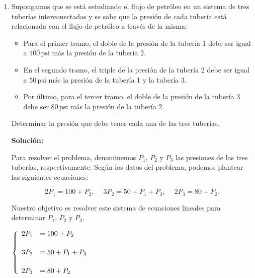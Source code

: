 \documentclass[11pt]{article}
\newcommand{\indicador}[4]{
{\tikz[remember picture,overlay]\coordinate (#1) at #2;}{\tikz[remember picture,overlay]\coordinate (#3) at #4;} 
}
\newcommand{\marka}[2]{
{\tikz[remember picture,overlay]\coordinate (#1) at #2;}
}
\begin{document}
\begin{enumerate}[\hspace{-7mm} 1) ]
\begin{enumerate}[a) ]
\textbf{Respuesta:}

Se deben extraer $\mathbf{366,\hat{6}}$ toneladas de mineral de la mina 1 y $\mathbf{33,\hat{3}}$ toneladas de mineral de la mina 2 para obtener las cantidades deseadas de níquel y cobre.

\end{enumerate}








\item 
Supongamos que se está estudiando el flujo de petróleo en un sistema de tres tuberías interconectadas y se sabe que la presión de cada tubería está relacionada con el flujo de petróleo a través de la misma:
\begin{itemize}
    \item Para el primer tramo, el doble de la presión de la tubería 1 debe ser igual a \( 100 \, \text{psi} \) más la presión de la tubería 2.
    \item En el segundo tramo, el triple de la presión de la tubería 2 debe ser igual a \( 50 \, \text{psi} \) más la presión de la tubería 1 y la tubería 3.
    \item Por último, para el tercer tramo, el doble de la presión de la tubería 3 debe ser \( 80 \, \text{psi} \) más la presión de la tubería 2.
\end{itemize}
Determinar la presión que debe tener cada una de las tres tuberías.



\textbf{Solución: }

Para resolver el problema, denominemos \( P_1 \), \( P_2 \) y \( P_3 \) las presiones de las tres tuberías, respectivamente. Según los datos del problema, podemos plantear las siguientes ecuaciones:

\[
    2P_1 = 100 + P_2,  \quad\
    3P_2 = 50 + P_1 + P_3, \quad\
    2P_3 = 80 + P_2. \]

Nuestro objetivo es resolver este sistema de ecuaciones lineales para determinar \( P_1 \), \( P_2 \) y \( P_3 \).

\bigskip 

$
\left\{
\begin{array}{rl}
    2P_1 &= 100 + P_2  \indicador{x}{(.1,.15)}{y}{(1.3,.15)}
 \\[5mm]
    3P_2 &= 50 + P_1 + P_3  \marka{z}{(.1,.15)}
\\[5mm]
    2P_3 &= 80 + P_2   \marka{w}{(.1,.15)}
\end{array}
\right.$


\end{enumerate}
\end{document}
